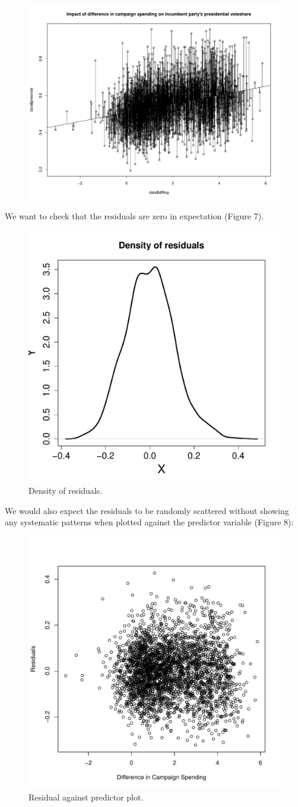 \documentclass[12pt,letterpaper]{article}
\begin{document}
\begin{enumerate}
\begin{figure}[h!]
	\label{fig:plot_6}
	\includegraphics[width=.5\textwidth]{plot6_residuals and regression line.pdf}
\end{figure}
\noindent We want to check that the residuals are zero in expectation (Figure 7).\\
\vspace{.5cm}
  
\vspace{.5cm}  
\begin{figure}[h!]\centering
	\caption{\footnotesize Density of residuals.}
	\label{fig:plot_7}
	\includegraphics[width=.5\textwidth]{plot7_density of residuals.pdf}
\end{figure}
\newpage	
\noindent We would also expect the residuals to be randomly scattered without showing any  systematic patterns when plotted against the predictor variable (Figure 8):\\
\vspace{.5cm}
  
\vspace{.5cm}  
\begin{figure}[h!]\centering
	\caption{\footnotesize Residual against predictor plot.}
	\label{fig:plot_8}
	\includegraphics[width=.5\textwidth]{plot8_residual against predictor.pdf}

\end{figure}
\end{enumerate}
\end{document}
